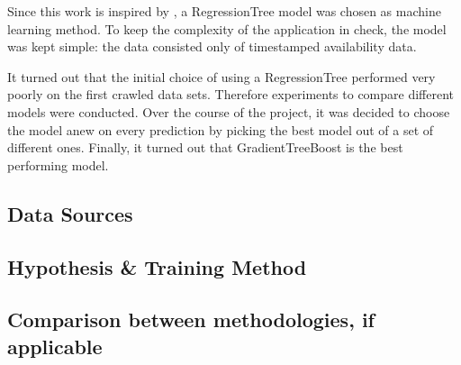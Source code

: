 Since this work is inspired by \cite{parkendd}, a RegressionTree model was chosen as machine learning method. To keep the complexity of the application in check, the model was kept simple: the data consisted only of timestamped availability data.

It turned out that the initial choice of using a RegressionTree performed very poorly on the first crawled data sets. 
Therefore experiments to compare different models were conducted. Over the course of the project, it was decided to 
choose the model anew on every prediction by picking the best model out of a set of different ones. Finally, it turned out that GradientTreeBoost is the best performing model.  

\subsection{Data Sources}\label{data sources}


\subsection{Hypothesis \& Training Method}\label{sec:training_model}



\subsection{Comparison between methodologies, if applicable}
